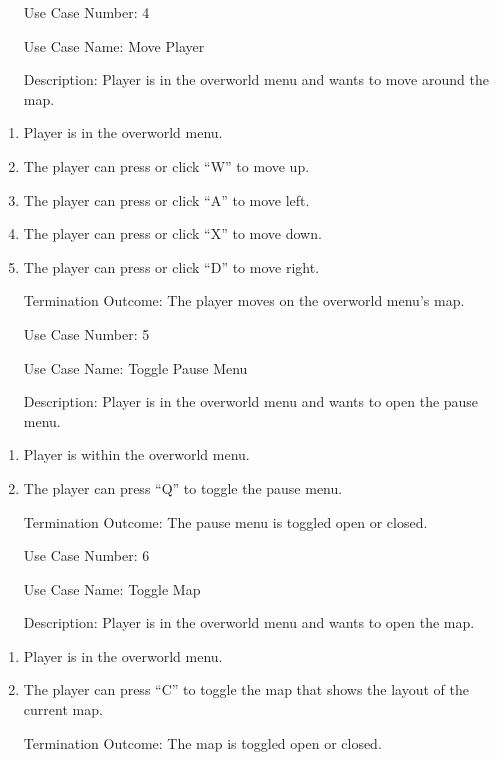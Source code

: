 \documentclass[10pt,conference,onecolumn,compsoc]{IEEEtran}
\begin{document}
\begin{itemize}
\item[Use Case Number:] 4
\item[Use Case Name:] Move Player
\item[Description:] Player is in the overworld menu and wants to move around the map.
\end{itemize}
\begin{enumerate}
\item Player is in the overworld menu.
\item The player can press or click “W” to move up.
\item The player can press or click “A” to move left.
\item The player can press or click “X” to move down.
\item The player can press or click “D” to move right.
\item [Termination Outcome:] The player moves on the overworld menu's map.
\end{enumerate}

\begin{itemize}
\item[Use Case Number:] 5
\item[Use Case Name:] Toggle Pause Menu
\item[Description:] Player is in the overworld menu and wants to open the pause menu.
\end{itemize}
\begin{enumerate}
\item Player is within the overworld menu.
\item The player can press “Q” to toggle the pause menu.
\item [Termination Outcome:] The pause menu is toggled open or closed.
\end{enumerate}

\begin{itemize}
\item[Use Case Number:] 6
\item[Use Case Name:] Toggle Map
\item[Description:] Player is in the overworld menu and wants to open the map.
\end{itemize}
\begin{enumerate}
\item Player is in the overworld menu.
\item The player can press “C” to toggle the map that shows the layout of the current map.
\item [Termination Outcome:] The map is toggled open or closed.
\end{enumerate}
\end{document}
